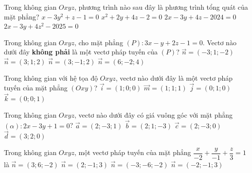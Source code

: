 \begin{ex}%
	Trong không gian $O x y z$, phương trình nào sau đây là phương trình tổng quát của mặt phẳng?
	\choice
	{$x-3 y^2+z-1=0$}
	{$x^2+2 y+4 z-2=0$}
	{\True $2 x-3 y+4 z-2024=0$}
	{$2 x-3 y+4 z^2-2025=0$}
\end{ex}

\begin{ex}%
	Trong không gian $O x y z$, cho mặt phẳng $(P)\colon 3 x-y+2 z-1=0$. Vectơ nào dưới đây \textbf{không phải} là một vectơ pháp tuyến của $(P)$?
	\choice
	{$\overrightarrow{n}=(-3; 1;-2)$}
	{\True $\overrightarrow{n}=(3; 1; 2)$}
	{$\overrightarrow{n}=(3;-1; 2)$}
	{$\overrightarrow{n}=(6;-2; 4)$}
\end{ex}

\begin{ex}%
	Trong không gian với hệ tọa độ $O x y z$, vectơ nào dưới đây là một vectơ pháp tuyến của mặt phẳng $(O x y)$?
	\choice
	{$\overrightarrow{i}=(1; 0; 0)$}
	{$\overrightarrow{m}=(1; 1; 1)$}
	{$\overrightarrow{j}=(0; 1; 0)$}
	{\True $\overrightarrow{k}=(0; 0; 1)$}
\end{ex}

\begin{ex}%
	Trong không gian $O x y z$, vectơ nào dưới đây có giá vuông góc với mặt phẳng $(\alpha)\colon 2 x-3 y+1=0$?
	\choice
	{$\overrightarrow{a}=(2;-3; 1)$}
	{$\overrightarrow{b}=(2; 1;-3)$}
	{\True $\overrightarrow{c}=(2;-3; 0)$}
	{$\overrightarrow{d}=(3; 2; 0)$}
\end{ex}

\begin{ex}%
	Trong không gian $O x y z$, một vectơ pháp tuyến của mặt phẳng $\dfrac{x}{-2}+\dfrac{y}{-1}+\dfrac{z}{3}=1$ là
	\choice
	{\True $\overrightarrow{n}=(3; 6;-2)$}
	{$\overrightarrow{n}=(2;-1; 3)$}
	{$\overrightarrow{n}=(-3;-6;-2)$}
	{$\overrightarrow{n}=(-2;-1; 3)$}
\end{ex}

